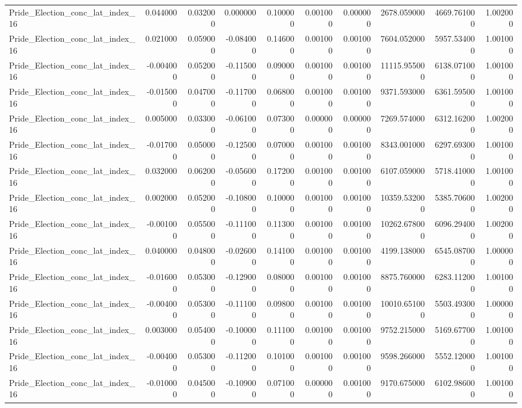 \begin{table}
\begin{tabular}{lrrrrrrrrr}
Pride_Election_conc_lat_index_16 & 0.044000 & 0.032000 & 0.000000 & 0.100000 & 0.001000 & 0.000000 & 2678.059000 & 4669.761000 & 1.002000 \\
Pride_Election_conc_lat_index_16 & 0.021000 & 0.059000 & -0.084000 & 0.146000 & 0.001000 & 0.001000 & 7604.052000 & 5957.534000 & 1.001000 \\
Pride_Election_conc_lat_index_16 & -0.004000 & 0.052000 & -0.115000 & 0.090000 & 0.001000 & 0.001000 & 11115.955000 & 6138.071000 & 1.001000 \\
Pride_Election_conc_lat_index_16 & -0.015000 & 0.047000 & -0.117000 & 0.068000 & 0.001000 & 0.001000 & 9371.593000 & 6361.595000 & 1.001000 \\
Pride_Election_conc_lat_index_16 & 0.005000 & 0.033000 & -0.061000 & 0.073000 & 0.000000 & 0.000000 & 7269.574000 & 6312.162000 & 1.002000 \\
Pride_Election_conc_lat_index_16 & -0.017000 & 0.050000 & -0.125000 & 0.070000 & 0.001000 & 0.001000 & 8343.001000 & 6297.693000 & 1.001000 \\
Pride_Election_conc_lat_index_16 & 0.032000 & 0.062000 & -0.056000 & 0.172000 & 0.001000 & 0.001000 & 6107.059000 & 5718.410000 & 1.001000 \\
Pride_Election_conc_lat_index_16 & 0.002000 & 0.052000 & -0.108000 & 0.100000 & 0.001000 & 0.001000 & 10359.532000 & 5385.706000 & 1.002000 \\
Pride_Election_conc_lat_index_16 & -0.001000 & 0.055000 & -0.111000 & 0.113000 & 0.001000 & 0.001000 & 10262.678000 & 6096.294000 & 1.002000 \\
Pride_Election_conc_lat_index_16 & 0.040000 & 0.048000 & -0.026000 & 0.141000 & 0.001000 & 0.001000 & 4199.138000 & 6545.087000 & 1.000000 \\
Pride_Election_conc_lat_index_16 & -0.016000 & 0.053000 & -0.129000 & 0.080000 & 0.001000 & 0.001000 & 8875.760000 & 6283.112000 & 1.001000 \\
Pride_Election_conc_lat_index_16 & -0.004000 & 0.053000 & -0.111000 & 0.098000 & 0.001000 & 0.001000 & 10010.651000 & 5503.493000 & 1.000000 \\
Pride_Election_conc_lat_index_16 & 0.003000 & 0.054000 & -0.100000 & 0.111000 & 0.001000 & 0.001000 & 9752.215000 & 5169.677000 & 1.001000 \\
Pride_Election_conc_lat_index_16 & -0.004000 & 0.053000 & -0.112000 & 0.101000 & 0.001000 & 0.001000 & 9598.266000 & 5552.120000 & 1.001000 \\
Pride_Election_conc_lat_index_16 & -0.010000 & 0.045000 & -0.109000 & 0.071000 & 0.000000 & 0.001000 & 9170.675000 & 6102.986000 & 1.001000 \\

\end{tabular}
\end{table}
